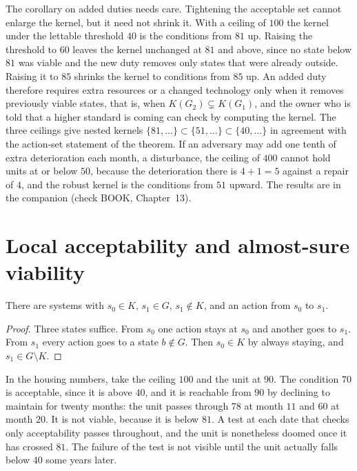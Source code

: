 The corollary on added duties needs care. Tightening the acceptable set cannot enlarge the kernel, but it need not shrink it. With a ceiling of $100$ the kernel under the lettable threshold $40$ is the conditions from $81$ up. Raising the threshold to $60$ leaves the kernel unchanged at $81$ and above, since no state below $81$ was viable and the new duty removes only states that were already outside. Raising it to $85$ shrinks the kernel to conditions from $85$ up. An added duty therefore requires extra resources or a changed technology only when it removes previously viable states, that is, when $K(G_2)\subsetneq K(G_1)$, and the owner who is told that a higher standard is coming can check by computing the kernel. The three ceilings give nested kernels $\{81,\dots\}\subset\{51,\dots\}\subset\{40,\dots\}$ in agreement with the action-set statement of the theorem. If an adversary may add one tenth of extra deterioration each month, a disturbance, the ceiling of $400$ cannot hold units at or below $50$, because the deterioration there is $4+1=5$ against a repair of $4$, and the robust kernel is the conditions from $51$ upward. The results are in the companion (check BOOK, Chapter~13).

\section{Local acceptability and almost-sure viability}

\begin{proposition}\label{prop:P05}
There are systems with $s_0\in K$, $s_1\in G$, $s_1\notin K$, and an action from $s_0$ to $s_1$.
\end{proposition}

\begin{proof}
Three states suffice. From $s_0$ one action stays at $s_0$ and another goes to $s_1$. From $s_1$ every action goes to a state $b\notin G$. Then $s_0\in K$ by always staying, and $s_1\in G\setminus K$.
\end{proof}

In the housing numbers, take the ceiling $100$ and the unit at $90$. The condition $70$ is acceptable, since it is above $40$, and it is reachable from $90$ by declining to maintain for twenty months: the unit passes through $78$ at month $11$ and $60$ at month $20$. It is not viable, because it is below $81$. A test at each date that checks only acceptability passes throughout, and the unit is nonetheless doomed once it has crossed $81$. The failure of the test is not visible until the unit actually falls below $40$ some years later.

